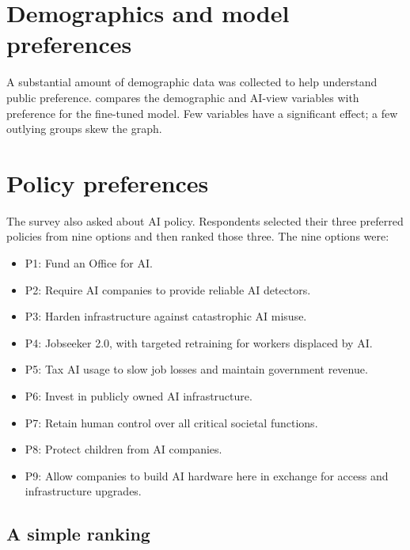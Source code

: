 
\section{Demographics and model preferences}
\label{sec:survey-demographics}

A substantial amount of demographic data was collected to help understand public preference.  compares the demographic and AI-view variables with preference for the fine-tuned model. Few variables have a significant effect; a few outlying groups skew the graph.


\section{Policy preferences}
\label{sec:survey-policy-preferences}

The survey also asked about AI policy. Respondents selected their three preferred policies from nine options and then ranked those three. The nine options were:

\begin{itemize}[leftmargin=*]
    \item P1: Fund an Office for AI.
    \item P2: Require AI companies to provide reliable AI detectors.
    \item P3: Harden infrastructure against catastrophic AI misuse.
    \item P4: Jobseeker 2.0, with targeted retraining for workers displaced by AI.
    \item P5: Tax AI usage to slow job losses and maintain government revenue.
    \item P6: Invest in publicly owned AI infrastructure.
    \item P7: Retain human control over all critical societal functions.
    \item P8: Protect children from AI companies.
    \item P9: Allow companies to build AI hardware here in exchange for access and infrastructure upgrades.
\end{itemize}

\subsection{A simple ranking}

